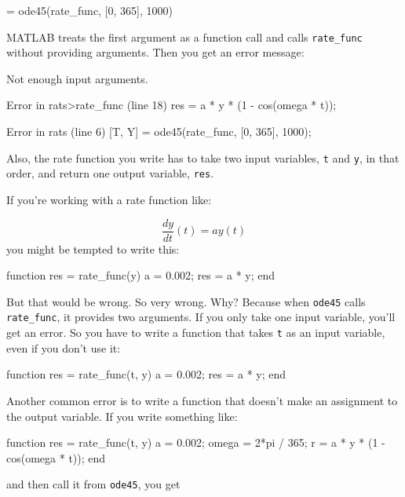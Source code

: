 \begin{code}
[T, Y] = ode45(rate_func, [0, 365], 1000)
\end{code}
MATLAB treats the first argument as a function
call and calls \lstinline{rate_func} without providing arguments.
Then you get an error message:


\begin{code}
Not enough input arguments.

Error in rats>rate_func (line 18)
    res = a * y * (1 - cos(omega * t));

Error in rats (line 6)
    [T, Y] = ode45(rate_func, [0, 365], 1000);
\end{code}

Also, the rate function you write has to take two input variables,
\lstinline{t} and \lstinline{y}, in that order, and return one output variable,
\lstinline{res}.


If you're working with a rate function like:

\begin{equation*}
\frac{dy}{dt}(t) = a y(t)
\end{equation*}
you might be tempted to write this:

\begin{code}
function res = rate_func(y)        %
    a = 0.002;
    res = a * y;
end
\end{code}

But that would be wrong.  So very wrong.  Why?  Because
when \lstinline{ode45} calls \lstinline{rate_func}, it provides two arguments.
If you only take one input variable, you'll get an error.  So
you have to write a function that takes \lstinline{t} as an input
variable, even if you don't use it:


\begin{code}
function res = rate_func(t, y)     %
    a = 0.002;
    res = a * y;
end
\end{code}

Another common error is to write a function that doesn't make
an assignment to the output variable.  If you write something
like:

\begin{code}
function res = rate_func(t, y)
    a = 0.002;
    omega = 2*pi / 365;
    r = a * y * (1 - cos(omega * t));    %
end
\end{code}
 and then call it from \lstinline{ode45}, you get

